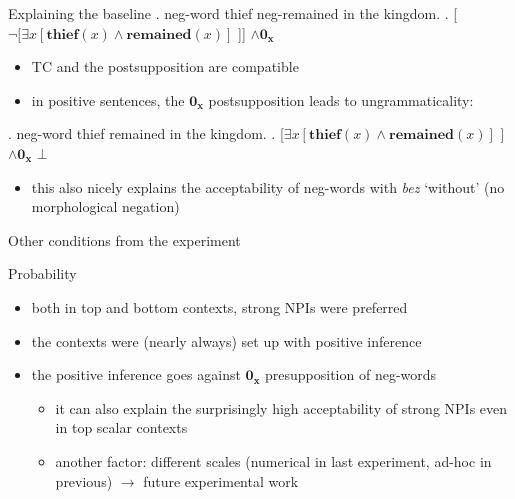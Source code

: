 \documentclass[
  ignorenonframetext,
]{beamer}
\providecommand{\tightlist}{%
  \setlength{\itemsep}{0pt}\setlength{\parskip}{0pt}}
\begin{document}
\begin{frame}
\begin{block}{Explaining the baseline}
\protect\hypertarget{explaining-the-baseline}{}
\ex. neg-word thief neg-remained in the kingdom. \a.
{[}\(\neg[\exists x[\mathbf{thief}(x) \wedge \mathbf{remained}(x)]\)
{]}{]} \(\wedge \mathbf{0_x}\)

\begin{itemize}
\tightlist
\item
  TC and the postsupposition are compatible
\item
  in positive sentences, the \(\mathbf{0_x}\) postsupposition leads to
  ungrammaticality:
\end{itemize}

\ex. neg-word thief remained in the kingdom. \a.
{[}\(\exists x[\mathbf{thief}(x) \wedge \mathbf{remained}(x)]\) {]}
\(\wedge \mathbf{0_x}\) \hfill \(\bot\)

\begin{itemize}
\tightlist
\item
  this also nicely explains the acceptability of neg-words with
  \emph{bez} `without' (no morphological negation)
\end{itemize}
\end{block}
\end{frame}

\begin{frame}
\begin{block}{Other conditions from the experiment}
\protect\hypertarget{other-conditions-from-the-experiment-1}{}
\begin{block}{Probability}
\protect\hypertarget{probability}{}
\begin{itemize}
\tightlist
\item
  both in top and bottom contexts, strong NPIs were preferred
\item
  the contexts were (nearly always) set up with positive inference
\item
  the positive inference goes against \(\mathbf{0_x}\) presupposition of
  neg-words

  \begin{itemize}
  \tightlist
  \item
    it can also explain the surprisingly high acceptability of strong
    NPIs even in top scalar contexts
  \item
    another factor: different scales (numerical in last experiment,
    ad-hoc in previous) \(\rightarrow\) future experimental work
  \end{itemize}
\end{itemize}
\end{block}
\end{block}
\end{frame}
\end{document}
